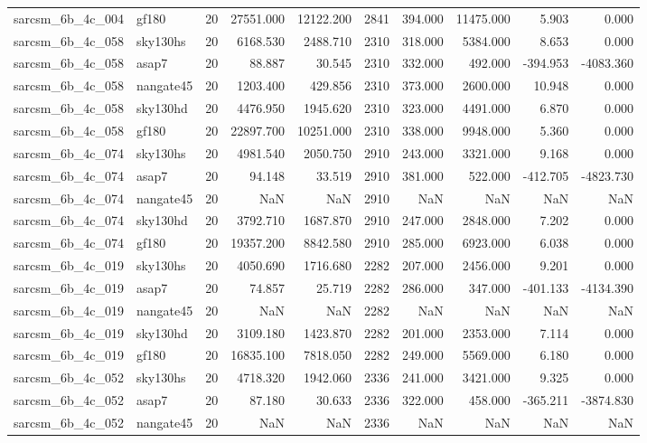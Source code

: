 \begin{longtable}{llrrrrrrrr}
sarcsm\_6b\_4c\_004 & gf180 & 20 & 27551.000 & 12122.200 & 2841 & 394.000 & 11475.000 & 5.903 & 0.000 \\
sarcsm\_6b\_4c\_058 & sky130hs & 20 & 6168.530 & 2488.710 & 2310 & 318.000 & 5384.000 & 8.653 & 0.000 \\
sarcsm\_6b\_4c\_058 & asap7 & 20 & 88.887 & 30.545 & 2310 & 332.000 & 492.000 & -394.953 & -4083.360 \\
sarcsm\_6b\_4c\_058 & nangate45 & 20 & 1203.400 & 429.856 & 2310 & 373.000 & 2600.000 & 10.948 & 0.000 \\
sarcsm\_6b\_4c\_058 & sky130hd & 20 & 4476.950 & 1945.620 & 2310 & 323.000 & 4491.000 & 6.870 & 0.000 \\
sarcsm\_6b\_4c\_058 & gf180 & 20 & 22897.700 & 10251.000 & 2310 & 338.000 & 9948.000 & 5.360 & 0.000 \\
sarcsm\_6b\_4c\_074 & sky130hs & 20 & 4981.540 & 2050.750 & 2910 & 243.000 & 3321.000 & 9.168 & 0.000 \\
sarcsm\_6b\_4c\_074 & asap7 & 20 & 94.148 & 33.519 & 2910 & 381.000 & 522.000 & -412.705 & -4823.730 \\
sarcsm\_6b\_4c\_074 & nangate45 & 20 & NaN & NaN & 2910 & NaN & NaN & NaN & NaN \\
sarcsm\_6b\_4c\_074 & sky130hd & 20 & 3792.710 & 1687.870 & 2910 & 247.000 & 2848.000 & 7.202 & 0.000 \\
sarcsm\_6b\_4c\_074 & gf180 & 20 & 19357.200 & 8842.580 & 2910 & 285.000 & 6923.000 & 6.038 & 0.000 \\
sarcsm\_6b\_4c\_019 & sky130hs & 20 & 4050.690 & 1716.680 & 2282 & 207.000 & 2456.000 & 9.201 & 0.000 \\
sarcsm\_6b\_4c\_019 & asap7 & 20 & 74.857 & 25.719 & 2282 & 286.000 & 347.000 & -401.133 & -4134.390 \\
sarcsm\_6b\_4c\_019 & nangate45 & 20 & NaN & NaN & 2282 & NaN & NaN & NaN & NaN \\
sarcsm\_6b\_4c\_019 & sky130hd & 20 & 3109.180 & 1423.870 & 2282 & 201.000 & 2353.000 & 7.114 & 0.000 \\
sarcsm\_6b\_4c\_019 & gf180 & 20 & 16835.100 & 7818.050 & 2282 & 249.000 & 5569.000 & 6.180 & 0.000 \\
sarcsm\_6b\_4c\_052 & sky130hs & 20 & 4718.320 & 1942.060 & 2336 & 241.000 & 3421.000 & 9.325 & 0.000 \\
sarcsm\_6b\_4c\_052 & asap7 & 20 & 87.180 & 30.633 & 2336 & 322.000 & 458.000 & -365.211 & -3874.830 \\
sarcsm\_6b\_4c\_052 & nangate45 & 20 & NaN & NaN & 2336 & NaN & NaN & NaN & NaN \\

\end{longtable}
